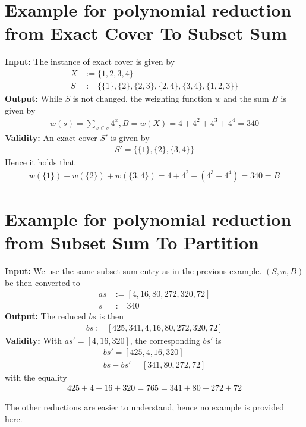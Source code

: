 \section{Example for polynomial reduction from Exact Cover To Subset Sum}
\textbf{Input:} The instance of exact cover is given by 
\begin{align*}
    X &:= \{1, 2, 3, 4\} \\ 
    S &:= \{\{1\}, \{2\}, \{2, 3\}, 
    \{2, 4\}, \{3, 4\}, \{1, 2, 3\}\}
\end{align*}
\textbf{Output:} 
While $S$ is not changed, the weighting function $w$ and the sum $B$ is given by 
\begin{align*}
    w(s) = \sum_{x \in s} 4^x,
    B = w(X) = 4 + 4^2 + 4^3 + 4^4 = 340
\end{align*}
\textbf{Validity:} An exact cover $S'$ is given by 
\begin{align*}
    S' = \{\{1\}, \{2\}, \{3, 4\}\}
\end{align*}
Hence it holds that 
\begin{align*}
    w(\{1\}) + w(\{2\}) + w(\{3,4\}) = 4 + 4^2 + (4^3 + 4^4) = 340 = B
\end{align*}

\section{Example for polynomial reduction from Subset Sum To Partition} 
\textbf{Input:} We use the same subset sum entry as in the previous example. $(S, w, B)$ be 
then converted to 
\begin{align*}
    as &:= [4, 16, 80, 272, 320, 72] \\ 
    s &:= 340
\end{align*}
\textbf{Output:} The reduced $bs$ is then 
\begin{align*}
    bs := [425, 341, 4, 16, 80, 272, 320, 72]
\end{align*}
\textbf{Validity:} With $as' = [4, 16, 320]$, the corresponding $bs'$ is 
\begin{align*}
    bs' = [425, 4, 16, 320] \\ 
    bs - bs' = [341, 80, 272, 72]
\end{align*}
with the equality
\begin{align*}
    425 + 4 + 16 + 320 = 765 = 341 + 80 + 272 + 72 
\end{align*}

The other reductions are easier to understand, hence no example is provided here.


